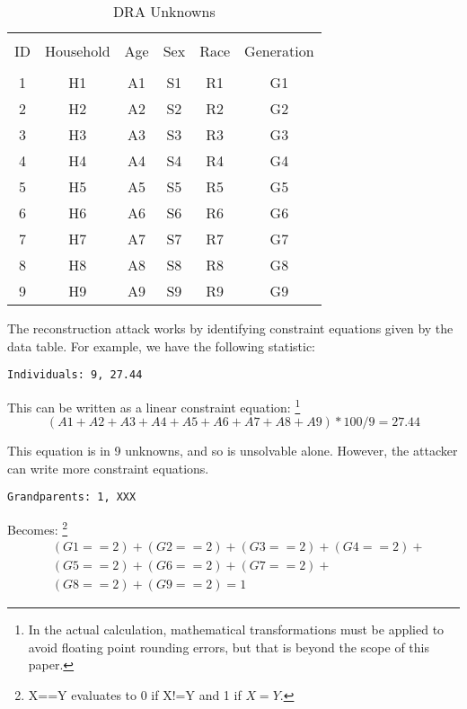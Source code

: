 \documentclass[jou,apacite]{apa6}
\begin{document}
\begin{table}[!htb]
\caption{DRA Unknowns}\label{tab6}
\begin{tabular}{c|c|c|c|c|c}
\hline\\[-1.5ex]
ID & Household & Age & Sex & Race & Generation \\[0.5ex]
\hline\\[-1.5ex]
1 & H1 & A1 & S1 & R1 & G1  \\[0.5ex]
2 & H2 & A2 & S2 & R2 & G2  \\[0.5ex]
3 & H3 & A3 & S3 & R3 & G3  \\[0.5ex]
4 & H4 & A4 & S4 & R4 & G4  \\[0.5ex]
5 & H5 & A5 & S5 & R5 & G5  \\[0.5ex]
6 & H6 & A6 & S6 & R6 & G6  \\[0.5ex]
7 & H7 & A7 & S7 & R7 & G7  \\[0.5ex]
8 & H8 & A8 & S8 & R8 & G8  \\[0.5ex]
9 & H9 & A9 & S9 & R9 & G9  \\[0.5ex]
\hline
\end{tabular}
\end{table}

The reconstruction attack works by identifying constraint
equations given by the data table. For example, we have the
following statistic:
\begin{verbatim}
Individuals: 9, 27.44
\end{verbatim}

This can be written as a linear constraint equation: \footnote{In the actual calculation, mathematical transformations must be applied to avoid floating point rounding errors, but that is beyond the scope of this paper.}
\[(A1 + A2 + A3 + A4 + A5 + A6 + A7 + A8 + A9)*100/9 = 27.44\]

This equation is in 9 unknowns, and so is unsolvable alone.
However, the attacker can write more constraint equations.

\begin{verbatim}
Grandparents: 1, XXX
\end{verbatim}


Becomes: \footnote{X==Y evaluates to 0 if X!=Y and 1 if $X=Y$.}
\begin{align*}
& (G1==2) + (G2==2) + (G3==2) + (G4==2) + \\
& (G5==2)+ (G6==2) + (G7==2) +\\
& (G8==2) + (G9==2) = 1
\end{align*}
\end{document}
